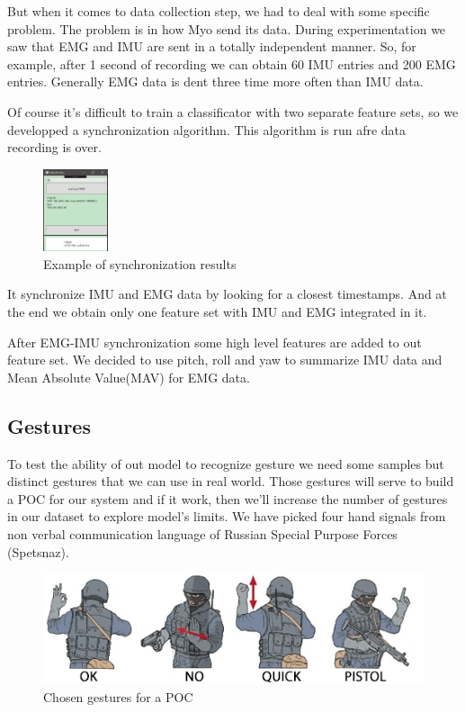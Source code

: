 \documentclass[conference,compsoc]{IEEEtran}
\begin{document}
But when it comes to data collection step, we had to deal with some specific problem. The problem is in how Myo send its data. During experimentation we saw that EMG and IMU are sent in a totally independent manner. So, for example, after 1 second of recording we can obtain 60 IMU entries and 200 EMG entries. Generally EMG data is dent three time more often than IMU data. 

Of course it's difficult to train a classificator with two separate feature sets, so we developped a synchronization algorithm. This algorithm is run afre data recording is over. \begin{figure}
    \centering
    \caption{Example of synchronization results}
    \includegraphics[width=0.17\textwidth]{sync}
\end{figure} It synchronize IMU and EMG data by looking for a closest timestamps. And at the end we obtain only one feature set with IMU and EMG integrated in it.

After EMG-IMU synchronization some high level features are added to out feature set. We decided to use pitch, roll and yaw to summarize IMU data and Mean Absolute Value(MAV) for EMG data. 

\subsection{Gestures}
To test the ability of out model to recognize gesture we need some samples but distinct gestures that we can use in real world. Those gestures will serve to build a POC for our system and if it work, then we'll increase the number of gestures in our dataset to explore model's limits. We have picked four hand signals from non verbal communication language of Russian Special Purpose Forces (Spetsnaz).
\begin{figure}[h]
\caption{Chosen gestures for a POC}
\includegraphics[scale=0.45]{gest}
\centering
\end{figure}
\end{document}
